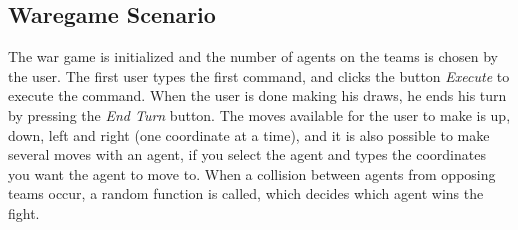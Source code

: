 \subsection{Waregame Scenario}

The war game is initialized and the number of agents on the teams is chosen by the user. The first user types the first command, and clicks the button \textit{Execute} to execute the command. When the user is done making his draws, he ends his turn by pressing the \textit{End Turn} button.
   The moves available for the user to make is up, down, left and right (one coordinate at a time), and it is also possible to make several moves with an agent, if you select the agent and types the coordinates you want the agent to move to.
   When a collision between agents from opposing teams occur, a random function is called, which decides which agent wins the fight.